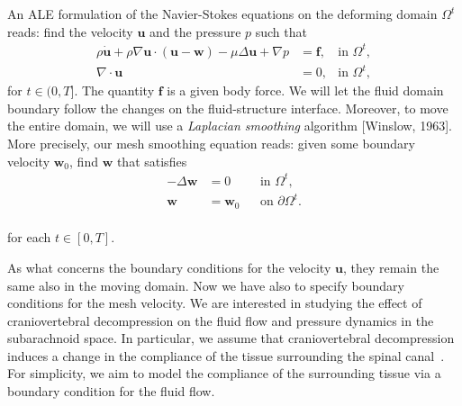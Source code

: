 \documentclass[a4paper,11pt,openright,twoside]{book}
\begin{document}


An ALE formulation of the Navier-Stokes equations on the deforming
domain $\Omega^t$ reads: find the velocity $\mathbf{u}$ and the
pressure $p$ such that
\begin{align}
  \label{eq:ns:1}
  \rho \dot{\mathbf{u}}
  + \rho \nabla \mathbf{u} \cdot (\mathbf{u} - \mathbf{w})
  - \mu \Delta \mathbf{u} + \nabla p
  &= \mathbf{f},  & \text{in } \Omega^t, \\
  \label{eq:ns:2}
  \nabla \cdot \mathbf{u} &= 0, & \text{in } \Omega^t,
\end{align}
for $t \in (0, T]$. The quantity $\mathbf{f}$ is a given body force.
We will let the fluid domain boundary follow the changes on the
fluid-structure interface. Moreover, to move the entire domain, we
will use a \emph{Laplacian smoothing}
algorithm [Winslow, 1963]. More precisely, our mesh smoothing
equation reads: given some boundary velocity $\mathbf{w}_0$, find
$\mathbf{w}$ that satisfies
\begin{align}
\label{eq:bc:2}
- \Delta \mathbf{w} &= 0 	&& \text{in } \Omega^t, \\
\mathbf{w} &= \mathbf{w}_0 && \text{on } \partial \Omega^t .
\end{align}
\\
for each $t \in [0, T]$.



As what concerns the boundary conditions for the velocity $\mathbf{u}$, they remain the same also in the moving domain.
Now we have also to specify boundary conditions for the mesh velocity. We are interested in studying the effect of craniovertebral
decompression on the fluid flow and pressure dynamics in the
subarachnoid space. In particular, we assume that craniovertebral
decompression induces a change in the compliance of the tissue
surrounding the spinal canal~\cite{}. For simplicity, we aim to model
the compliance of the surrounding tissue via a boundary condition for
the fluid flow. 
\end{document}
